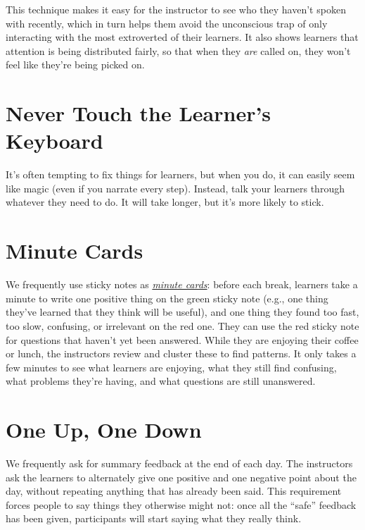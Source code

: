 \documentclass[10pt,statementpaper]{memoir}
\begin{document}
This technique makes it easy for the instructor to see who they haven't
spoken with recently, which in turn helps them avoid the unconscious
trap of only interacting with the most extroverted of their learners. It
also shows learners that attention is being distributed fairly, so that
when they \emph{are} called on, they won't feel like they're being
picked on.

\section{Never Touch the Learner's
Keyboard}\label{never-touch-the-learners-keyboard}

It's often tempting to fix things for learners, but when you do, it can
easily seem like magic (even if you narrate every step). Instead, talk
your learners through whatever they need to do. It will take longer, but
it's more likely to stick.

\section{Minute Cards}\label{minute-cards}

We frequently use sticky notes as
\emph{\href{gloss.html\#minute-cards}{minute cards}}: before each break,
learners take a minute to write one positive thing on the green sticky
note (e.g., one thing they've learned that they think will be useful),
and one thing they found too fast, too slow, confusing, or irrelevant on
the red one. They can use the red sticky note for questions that haven't
yet been answered. While they are enjoying their coffee or lunch, the
instructors review and cluster these to find patterns. It only takes a
few minutes to see what learners are enjoying, what they still find
confusing, what problems they're having, and what questions are still
unanswered.

\section{One Up, One Down}\label{one-up-one-down}

We frequently ask for summary feedback at the end of each day. The
instructors ask the learners to alternately give one positive and one
negative point about the day, without repeating anything that has
already been said. This requirement forces people to say things they
otherwise might not: once all the ``safe'' feedback has been given,
participants will start saying what they really think.
\end{document}

